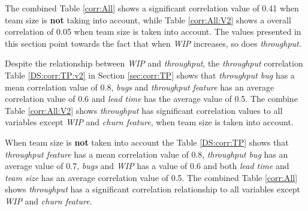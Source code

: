 \documentclass[UKenglish]{ifimaster}  %
\begin{document}
The combined Table \ref{corr:All} shows a significant correlation value of 0.41 when team size is \textbf{not} taking into account, while Table \ref{corr:All:V2} shows a overall correlation of 0.05 when team size is taken into account. The values presented in this section point towards the fact that when \textit{WIP} increases, so does \textit{throughput}.




Despite  the relationship between \textit{WIP} and \textit{throughput}, the \textit{throughput} correlation Table \ref{DS:corr:TP:v2} in Section \ref{sec:corr:TP} shows that \textit{throughput bug} has a mean correlation value of 0.8, \textit{bugs} and \textit{throughput feature} has an average correlation value of 0.6 and  \textit{lead time} has the average value of 0.5.
The combine Table \ref{corr:All:V2} shows \textit{throughput} has significant correlation values to all variables except \textit{WIP} and \textit{churn feature}, when team size is taken into account.

When team size is \textbf{not} taken into account the Table \ref{DS:corr:TP} shows that \textit{throughput feature} has a mean correlation value of 0.8, \textit{throughput bug} has an average value of 0.7, \textit{bugs} and \textit{WIP} has a value of 0.6 and both \textit{lead time} and \textit{team size} has an average correlation value of 0.5. The combined Table \ref{corr:All} shows \textit{throughput} has a significant correlation relationship to all variables except \textit{WIP} and \textit{churn feature}. 
\end{document}
